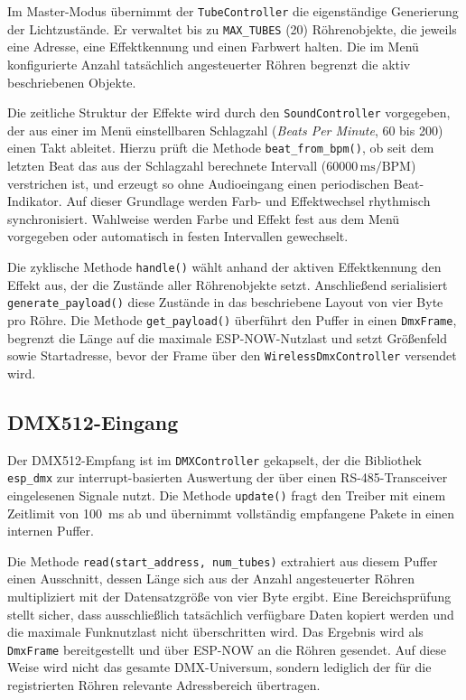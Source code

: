 Im Master-Modus übernimmt der \texttt{TubeController} die eigenständige
Generierung der Lichtzustände. Er verwaltet bis zu \texttt{MAX\_TUBES}
(20) Röhrenobjekte, die jeweils eine Adresse, eine Effektkennung und
einen Farbwert halten. Die im Menü konfigurierte Anzahl tatsächlich
angesteuerter Röhren begrenzt die aktiv beschriebenen Objekte.

Die zeitliche Struktur der Effekte wird durch den \texttt{SoundController}
vorgegeben, der aus einer im Menü einstellbaren Schlagzahl
(\textit{Beats Per Minute}, 60 bis 200) einen Takt ableitet. Hierzu
prüft die Methode \texttt{beat\_from\_bpm()}, ob seit dem letzten Beat
das aus der Schlagzahl berechnete Intervall (\(60000\,\text{ms} /
\text{BPM}\)) verstrichen ist, und erzeugt so ohne Audioeingang einen
periodischen Beat-Indikator. Auf dieser Grundlage werden Farb- und
Effektwechsel rhythmisch synchronisiert. Wahlweise werden Farbe und
Effekt fest aus dem Menü vorgegeben oder automatisch in festen
Intervallen gewechselt.

Die zyklische Methode \texttt{handle()} wählt anhand der aktiven
Effektkennung den Effekt aus, der die Zustände aller Röhrenobjekte setzt.
Anschließend serialisiert \texttt{generate\_payload()} diese Zustände in
das beschriebene Layout von vier Byte pro Röhre. Die Methode
\texttt{get\_payload()} überführt den Puffer in einen \texttt{DmxFrame},
begrenzt die Länge auf die maximale ESP-NOW-Nutzlast und setzt
Größenfeld sowie Startadresse, bevor der Frame über den
\texttt{WirelessDmxController} versendet wird.

\subsection{DMX512-Eingang}
\label{subsec:dmx-eingang}

Der DMX512-Empfang ist im \texttt{DMXController} gekapselt, der die
Bibliothek \texttt{esp\_dmx} zur interrupt-basierten Auswertung der über
einen RS-485-Transceiver eingelesenen Signale nutzt. Die Methode
\texttt{update()} fragt den Treiber mit einem Zeitlimit von 100~ms ab und
übernimmt vollständig empfangene Pakete in einen internen Puffer.

Die Methode \texttt{read(start\_address, num\_tubes)} extrahiert aus
diesem Puffer einen Ausschnitt, dessen Länge sich aus der Anzahl
angesteuerter Röhren multipliziert mit der Datensatzgröße von vier Byte
ergibt. Eine Bereichsprüfung stellt sicher, dass ausschließlich
tatsächlich verfügbare Daten kopiert werden und die maximale Funknutzlast
nicht überschritten wird. Das Ergebnis wird als \texttt{DmxFrame}
bereitgestellt und über ESP-NOW an die Röhren gesendet. Auf diese Weise
wird nicht das gesamte DMX-Universum, sondern lediglich der für die
registrierten Röhren relevante Adressbereich übertragen.

